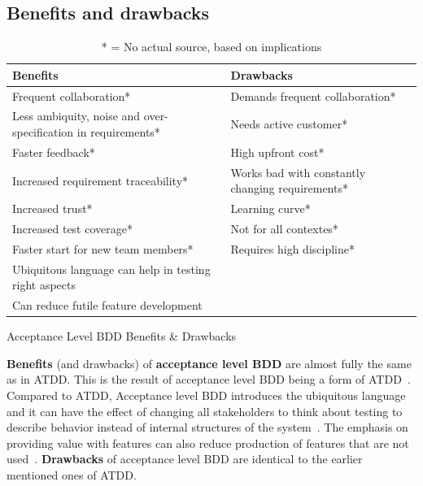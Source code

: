     \subsection{Benefits and drawbacks}

    \begin{table}[H]
        \begin{center}
            \begin{tabular}{ | p{6.3cm} | p{6.3cm} |}
            \hline
            \textbf{Benefits} & \textbf{Drawbacks} \\ \hline
            Frequent collaboration*~\cite{haugset2012automated} & Demands frequent collaboration*~\cite{haugset2012automated}  \\ \hline
            Less ambiquity, noise and over-specification in requirements*~\cite{haugset2012automated} & Needs active customer*~\cite{haugset2012automated}  \\ \hline
            Faster feedback*~\cite{haugset2012automated} & High upfront cost*~\cite{haugset2012automated}  \\ \hline
            Increased requirement traceability*~\cite{hayes2009towards} & Works bad with constantly changing requirements*~\cite{haugset2012automated}  \\ \hline
            Increased trust*~\cite{haugset2012automated} & Learning curve*~\cite{haugset2012automated} \\ \hline
            Increased test coverage*~\cite{haugset2012automated} & Not for all contextes*~\cite{haugset2012automated}  \\ \hline
            Faster start for new team members*~\cite{haugset2012automated} & Requires high discipline*~\cite{haugset2012automated}  \\ \hline
            Ubiquitous language can help in testing right aspects ~\cite{okolnychyi2016study} &  \\ \hline
            Can reduce futile feature development~\cite{smart2014bdd} &  \\ \hline
            \end{tabular}
            \caption {Acceptance Level BDD Benefits \& Drawbacks} \label{tab:bdd-acc-title}
            \caption* {* = No actual source, based on implications}
        \end{center}
    \end{table}
    \textbf{Benefits} (and drawbacks) of \textbf{acceptance level BDD} are almost fully the same as in ATDD. This is the result of
    acceptance level BDD being a form of ATDD~\cite{gartner2012atdd}. Compared to ATDD, Acceptance level BDD introduces the ubiquitous language
    and it can have the effect of changing all stakeholders to think about testing to describe
    behavior instead of internal structures of the system~\cite{okolnychyi2016study}. The emphasis on providing value with
    features can also reduce production of features that are not used~\cite{smart2014bdd}.
    \textbf{Drawbacks} of acceptance level BDD are identical to the earlier mentioned ones of ATDD.

